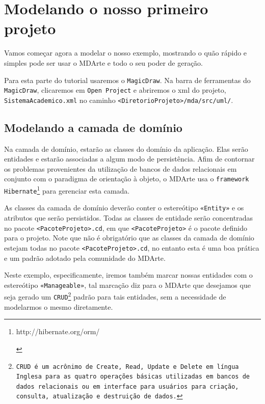 \begin{framed}
	
\end{framed}

\section{Modelando o nosso primeiro projeto}

Vamos começar agora a modelar o nosso exemplo, mostrando o quão rápido e simples
pode ser usar o MDArte e todo o seu poder de geração.

Para esta parte do tutorial usaremos o \texttt{MagicDraw}. Na barra de
ferramentas do \texttt{MagicDraw}, clicaremos em \texttt{Open Project} e
abriremos o xml do projeto, \texttt{SistemaAcademico.xml} no caminho
\texttt{<DiretorioProjeto>/mda/src/uml/}.

\subsection{Modelando a camada de domínio}
Na camada de domínio, estarão as classes do domínio da aplicação. Elas serão
entidades e estarão associadas a algum modo de persistência. Afim de
contornar os problemas provenientes da utilização de bancos de dados relacionais
em conjunto com o paradigma de orientação à objeto, o MDArte usa o \texttt{framework}
\texttt{Hibernate}\footnote{\hypertarget{http://hibernate.org/orm/}{http://hibernate.org/orm/}}
para gerenciar esta camada.

As classes da camada de domínio deverão conter o estereótipo \texttt{«Entity»} e
os atributos que serão persistidos. Todas as classes de entidade serão
concentradas no pacote \texttt{<PacoteProjeto>.cd}, em que
\texttt{<PacoteProjeto>} é o pacote definido para o projeto. Note que não é
obrigatório que as classes da camada de domínio estejam todas no pacote
\texttt{<PacoteProjeto>.cd}, no entanto esta é uma boa prática e um padrão
adotado pela comunidade do MDArte.

Neste exemplo, especificamente, iremos também marcar nossas entidades com o
estereótipo \texttt{«Manageable»}, tal marcação diz para o MDArte que desejamos
que seja gerado um \texttt{CRUD\footnote{CRUD é um acrônimo de Create, Read,
Update e Delete em língua Inglesa para as quatro operações básicas utilizadas em
bancos de dados relacionais ou em interface para usuários para criação,
consulta, atualização e destruição de dados.}} padrão para tais entidades, sem a
necessidade de modelarmos o mesmo diretamente.


